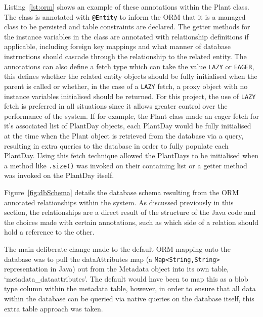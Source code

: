  Listing~\ref{lst:orm} shows an example of these annotations within the Plant class. The class is annotated with \texttt{@Entity} to inform the ORM that it is a managed class to be persisted and table constraints are declared. The getter methods for the instance variables in the class are annotated with relationship definitions if applicable, including foreign key mappings and what manner of database instructions should cascade through the relationship to the related entity. The annotations can also define a fetch type which can take the value \texttt{LAZY} or \texttt{EAGER}, this defines whether the related entity objects should be fully initialised when the parent is called or whether, in the case of a \texttt{LAZY} fetch, a proxy object with no instance variables initialised should be returned. For this project, the use of \texttt{LAZY} fetch is preferred in all situations since it allows greater control over the performance of the system. If for example, the Plant class made an eager fetch for it's associated list of PlantDay objects, each PlantDay would be fully initialised at the time when the Plant object is retrieved from the database via a query, resulting in extra queries to the database in order to fully populate each PlantDay. Using this fetch technique allowed the PlantDays to be initialised when a method like \texttt{.size()} was invoked on their containing list or a getter method was invoked on the PlantDay itself. 

\lstjava


Figure~\ref{fig:dbSchema} details the database schema resulting from the ORM annotated relationships within the system. As discussed previously in this section, the relationships are a direct result of the structure of the Java code and the choices made with certain annotations, such as which side of a relation should hold a reference to the other.

 The main deliberate change made to the default ORM mapping onto the database was to pull the dataAttributes map (a \texttt{Map<String,String>} representation in Java) out from the Metadata object into its own table, `metadata\_dataattributes'. The default would have been to map this as a blob type column within the metadata table, however, in order to ensure that all data within the database can be queried via native queries on the database itself, this extra table approach was taken.


